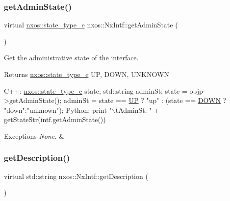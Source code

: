 \subsubsection{\texorpdfstring{get\+Admin\+State()}{getAdminState()}}
{\footnotesize\ttfamily virtual \mbox{\hyperlink{namespacenxos_a7c257059d03188765435b36e95dbb764}{nxos\+::state\+\_\+type\+\_\+e}} nxos\+::\+Nx\+Intf\+::get\+Admin\+State (\begin{DoxyParamCaption}{ }\end{DoxyParamCaption})\hspace{0.3cm}{\ttfamily [pure virtual]}}

Get the administrative state of the interface.

\begin{DoxyReturn}{Returns}
\mbox{\hyperlink{namespacenxos_a7c257059d03188765435b36e95dbb764}{nxos\+::state\+\_\+type\+\_\+e}} UP, D\+O\+WN, U\+N\+K\+N\+O\+WN
\end{DoxyReturn}

\begin{DoxyCode}
C++:
    \mbox{\hyperlink{namespacenxos_a7c257059d03188765435b36e95dbb764}{nxos::state\_type\_e}}  state;
    std::string adminSt;
    state   = objp->getAdminState();
    adminSt = state == \mbox{\hyperlink{namespacenxos_a7c257059d03188765435b36e95dbb764a7f57fa197f0e274e5c5d10c64d0f9436}{UP}} ? \textcolor{stringliteral}{"up"} : 
                  (state == \mbox{\hyperlink{namespacenxos_a7c257059d03188765435b36e95dbb764aa0756be42dc77ad57cf532f5c02e4c0a}{DOWN}} ? \textcolor{stringliteral}{"down"}:\textcolor{stringliteral}{"unknown"});
Python:
     print \textcolor{stringliteral}{"\(\backslash\)tAdminSt: "} + getStateStr(intf.getAdminState())
\end{DoxyCode}



\begin{DoxyExceptions}{Exceptions}
{\em None.} & \\
\hline
\end{DoxyExceptions}
\mbox{\label{classnxos_1_1_nx_intf_ae18aa83b5f9984c6b133a8d447aa5430}} 
\subsubsection{\texorpdfstring{get\+Description()}{getDescription()}}
{\footnotesize\ttfamily virtual std\+::string nxos\+::\+Nx\+Intf\+::get\+Description (\begin{DoxyParamCaption}{ }\end{DoxyParamCaption})\hspace{0.3cm}{\ttfamily [pure virtual]}}

